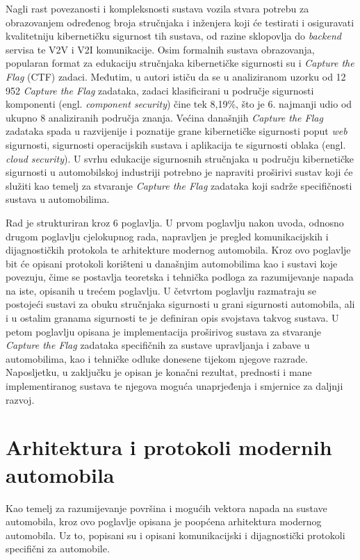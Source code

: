 \documentclass[times, utf8, diplomski, numeric]{fer}
\begin{document}
Nagli rast povezanosti i kompleksnosti sustava vozila stvara potrebu za obrazovanjem određenog broja stručnjaka i inženjera koji će testirati i osiguravati kvalitetniju kibernetičku sigurnost tih sustava, od razine sklopovlja do \textit{backend} servisa te V2V i V2I komunikacije. Osim formalnih sustava obrazovanja, popularan format za edukaciju stručnjaka kibernetičke sigurnosti su i \textit{Capture the Flag} (CTF) zadaci. Međutim, u \cite{vsvabensky2021cybersecurity} autori ističu da se u analiziranom uzorku od 12 952 \textit{Capture the Flag} zadataka, zadaci klasificirani u područje sigurnosti komponenti (engl. \textit{component security}) čine tek 8,19\%, što je 6. najmanji udio od ukupno 8 analiziranih područja znanja. Većina današnjih \textit{Capture the Flag} zadataka spada u razvijenije i poznatije grane kibernetičke sigurnosti poput \textit{web} sigurnosti, sigurnosti operacijskih sustava i aplikacija te sigurnosti oblaka (engl. \textit{cloud security})\cite{prinetto2020hardware}. U svrhu edukacije sigurnosnih stručnjaka u području kibernetičke sigurnosti u automobilskoj industriji potrebno je napraviti proširivi sustav koji će služiti kao temelj za stvaranje \textit{Capture the Flag} zadataka koji sadrže specifičnosti sustava u automobilima.

Rad je strukturiran kroz 6 poglavlja. U prvom poglavlju nakon uvoda, odnosno drugom poglavlju cjelokupnog rada, napravljen je pregled komunikacijskih i dijagnostičkih protokola te arhitekture modernog automobila. Kroz ovo poglavlje bit će opisani protokoli korišteni u današnjim automobilima kao i sustavi koje povezuju, čime se postavlja teoretska i tehnička podloga za razumijevanje napada na iste, opisanih u trećem poglavlju. U četvrtom poglavlju razmatraju se postojeći sustavi za obuku stručnjaka sigurnosti u grani sigurnosti automobila, ali i u ostalim granama sigurnosti te je definiran opis svojstava takvog sustava. U petom poglavlju opisana je implementacija proširivog sustava za stvaranje \textit{Capture the Flag} zadataka specifičnih za sustave upravljanja i zabave u automobilima, kao i tehničke odluke donesene tijekom njegove razrade. Naposljetku, u zaključku je opisan je konačni rezultat, prednosti i mane implementiranog sustava te njegova moguća unaprjeđenja i smjernice za daljnji razvoj.

\chapter{Arhitektura i protokoli modernih automobila}
Kao temelj za razumijevanje površina i mogućih vektora napada na sustave automobila, kroz ovo poglavlje opisana je poopćena arhitektura modernog automobila. Uz to, popisani su i opisani komunikacijski i dijagnostički protokoli specifični za automobile.
\end{document}
